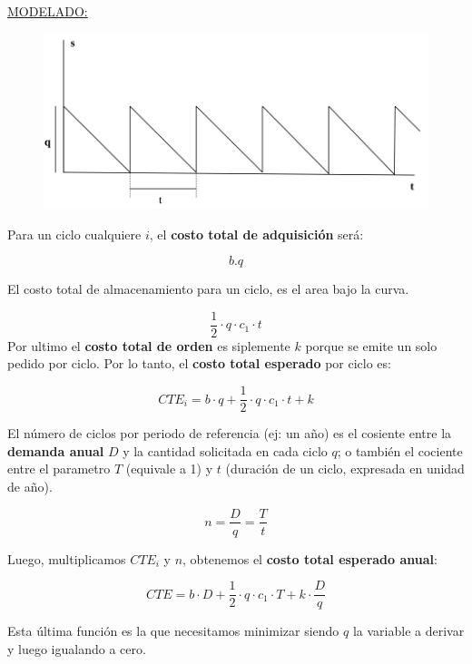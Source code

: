 \documentclass{article}
\begin{document}
\noindent
\underline{MODELADO:}

\begin{figure}[h!]
    \includegraphics[width=\linewidth]{imagenes/stock-modelo-basico.png}
\end{figure}

Para un ciclo cualquiere \(i\), el \textbf{costo total de adquisición} será:

\[
    b.q
\]

El costo total de almacenamiento para un ciclo, es el area bajo la curva.

\[
    \frac{1}{2} \cdot q \cdot c_1 \cdot t
\]
Por ultimo el \textbf{costo total de orden} es siplemente \(k\) porque se emite un solo pedido por ciclo. 
Por lo tanto, el \textbf{costo total esperado} por ciclo es:

\begin{equation}
    CTE_i= b \cdot q+\frac{1}{2} \cdot q \cdot c_1 \cdot t + k
\end{equation}

El número de ciclos por periodo de referencia (ej: un año) es el cosiente entre la \textbf{demanda anual} \(D\) 
y la cantidad solicitada en cada ciclo \(q\); o también el cociente entre el parametro \(T\) (equivale a 1) y \(t\)
(duración de un ciclo, expresada en unidad de año).

\begin{equation}
    n=\frac{D}{q}=\frac{T}{t}
\end{equation}


Luego, multiplicamos \(CTE_i\) y \(n\), obtenemos el \textbf{costo total esperado anual}:


\begin{equation}
    CTE= b \cdot D +\frac{1}{2} \cdot q \cdot c_1 \cdot T + k \cdot \frac{D}{q}
\end{equation}


Esta última función es la que necesitamos minimizar siendo \(q\) la variable a derivar y 
luego igualando a cero.
\end{document}
